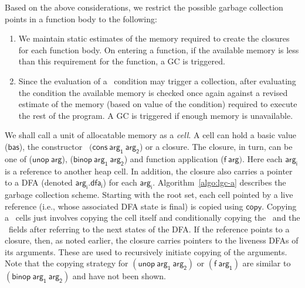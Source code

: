 \documentclass[9pt,preprint,nonatbib]{sigplanconf}
\begin{document}
Based on  the above considerations,  we restrict the  possible garbage
collection points in a function body to the following:
\begin{enumerate}
\item We  maintain static estimates  of the memory required  to create
  the closures for each function body.  On entering a function, if the
  available memory is  less than this requirement for  the function, a
  GC is triggered.
\item Since the evaluation of a  \SIF\ condition may trigger a 
  collection, after evaluating the condition   the available memory
  is  checked once  again against  a  revised estimate  of the  memory
  (based on  value of the condition)  required to execute the  rest of
  the program.  A GC is triggered if enough memory is unavailable.
\end{enumerate}




We shall call a  unit of allocatable memory as a {\em  cell}.  A cell can
hold    a    basic    value    ($\mathsf{bas}$),    the    constructor
\CONS\ $(\mathsf{cons~  arg_1~arg_2}$) or a closure.   The closure, in
turn,    can    be    one   of    ($\mathsf{unop~arg}$),    ($\mathsf{
  binop~arg_1~arg_2}$)  and  function application  ($\mathsf{f~arg})$.
Here each $\mathsf{  arg_i}$ is a reference to another  heap cell.  In
addition, the closure also carries  a pointer to a DFA (denoted
$\mathsf{arg_i.dfa_i}$) for each $\mathsf{arg_i}$.
Algorithm~\ref{algo:lgc-a}   describes   the   garbage
collection scheme.  Starting with the root set, each cell pointed by a
live reference  (i.e., whose associated  DFA state is final)  is copied
using $\mathsf{copy}$.   Copying a \CONS\ cells  just involves copying
the  cell  itself   and  conditionally  copying  the   \CAR\  and  the
\CDR\ fields after referring to the  next states of the DFA.  If
the reference points to a closure, then, as noted earlier, the closure
carries pointers  to the liveness  DFAs of its  arguments.  These
are  used to recursively  initiate copying of  the arguments.
Note that  the copying  strategy for  $\mathsf{(unop~arg_1~arg_2)}$ or
$\mathsf{(f~arg_1)}$ are similar to $\mathsf{(binop~arg_1~arg_2)}$ and
have not been shown.
\end{document}
